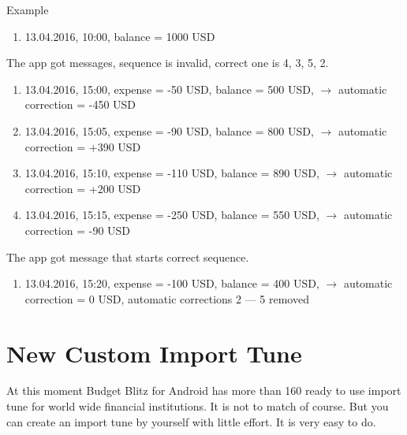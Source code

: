 \documentclass[a4paper,10pt,english]{sphinxmanual}
\begin{document}
Example
\begin{enumerate}
\def\theenumi{\arabic{enumi}}
\def\labelenumi{\theenumi .}
\makeatletter\def\p@enumii{\p@enumi \theenumi .}\makeatother
\item {} 
13.04.2016, 10:00, balance = 1000 USD

\end{enumerate}

The app got messages, sequence is invalid, correct one is 4, 3, 5, 2.
\begin{enumerate}
\def\theenumi{\arabic{enumi}}
\def\labelenumi{\theenumi .}
\makeatletter\def\p@enumii{\p@enumi \theenumi .}\makeatother
\setcounter{enumi}{1}
\item {} 
13.04.2016, 15:00, expense = -50 USD, balance = 500 USD, \(\rightarrow\) automatic correction = -450 USD

\item {} 
13.04.2016, 15:05, expense = -90 USD, balance = 800 USD, \(\rightarrow\) automatic correction = +390 USD

\item {} 
13.04.2016, 15:10, expense = -110 USD, balance = 890 USD, \(\rightarrow\) automatic correction = +200 USD

\item {} 
13.04.2016, 15:15, expense = -250 USD, balance = 550 USD, \(\rightarrow\) automatic correction = -90 USD

\end{enumerate}

The app got message that starts correct sequence.
\begin{enumerate}
\def\theenumi{\arabic{enumi}}
\def\labelenumi{\theenumi .}
\makeatletter\def\p@enumii{\p@enumi \theenumi .}\makeatother
\setcounter{enumi}{5}
\item {} 
13.04.2016, 15:20, expense = -100 USD, balance = 400 USD, \(\rightarrow\) automatic correction  = 0 USD, automatic corrections  2 — 5 removed

\end{enumerate}


\section{New Custom Import Tune}
\label{\detokenize{notifications:new-custom-import-tune}}
At this moment Budget Blitz for Android has more than 160 ready to use import tune for world wide financial institutions.
It is not to match of course. But you can create an import tune by yourself with little effort.
It is very easy to do.
\end{document}
